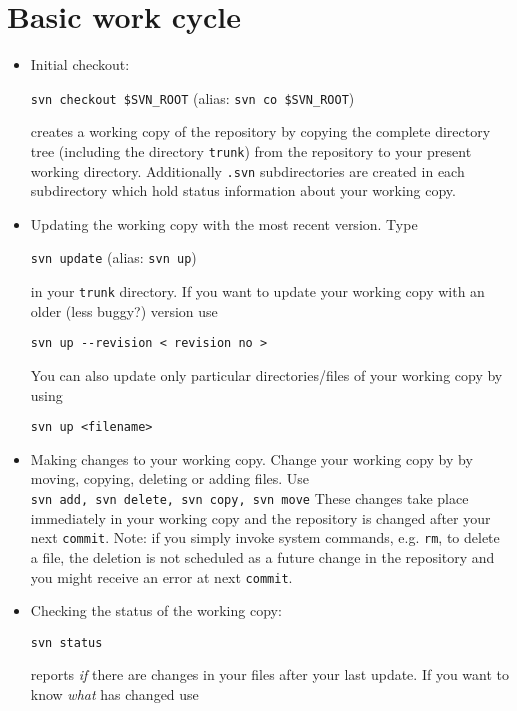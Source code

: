 \documentclass[12pt]{report}
\begin{document}
\section{ Basic work cycle}
\begin{itemize}
\item Initial checkout:

  \verb+svn checkout $SVN_ROOT+ (alias: \verb+svn co $SVN_ROOT+)

  \noindent creates a working copy of the repository by copying the
  complete directory tree (including the directory \verb+trunk+) from
  the repository to your present working directory. Additionally
  \verb+.svn+ subdirectories are created in each subdirectory which
  hold status information about your working copy.
\item Updating the working copy with the most recent version. Type

  \verb+svn update+ (alias: \verb+svn up+)

  \noindent in your \verb+trunk+ directory. If you want to update your
  working copy with an older (less buggy?)  version use

  \verb+svn up --revision < revision no >+

  \noindent You can also update only particular directories/files of
  your working copy by using

  \verb+svn up <filename>+

\item Making changes to your working copy. Change your working copy by
  by moving, copying, deleting or adding files. Use\\
  \verb+svn add, svn delete, svn copy, svn move+ These changes take
  place immediately in your working copy and the repository is changed
  after your next \verb+commit+. Note: if you simply invoke system
  commands, e.g. \verb+rm+, to delete a file, the deletion is not
  scheduled as a future change in the repository and you might receive
  an error at next \verb+commit+.

\item Checking the status of the working copy:

  \verb+svn status+

  reports {\em if} there are changes in your files after your last
  update. If you want to know {\em what} has changed use


\end{itemize}
\end{document}
